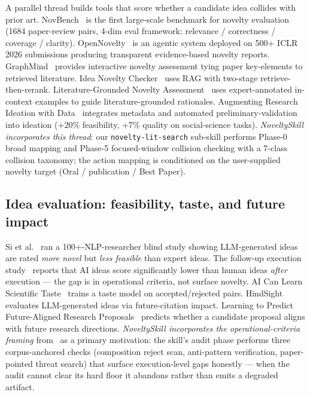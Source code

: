 \documentclass[10pt,a4paper]{article}
\begin{document}
A parallel thread builds tools that score whether a candidate idea collides with prior art. NovBench~\cite{novbench2026} is the first large-scale benchmark for novelty evaluation (1684 paper-review pairs, 4-dim eval framework: relevance / correctness / coverage / clarity). OpenNovelty~\cite{opennovelty2026} is an agentic system deployed on 500+ ICLR 2026 submissions producing transparent evidence-based novelty reports. GraphMind~\cite{graphmind2025} provides interactive novelty assessment tying paper key-elements to retrieved literature. Idea Novelty Checker~\cite{idea_novelty_checker2025} uses RAG with two-stage retrieve-then-rerank. Literature-Grounded Novelty Assessment~\cite{litgrounded2025} uses expert-annotated in-context examples to guide literature-grounded rationales. Augmenting Research Ideation with Data~\cite{augment_ideation2026} integrates metadata and automated preliminary-validation into ideation (+20\% feasibility, +7\% quality on social-science tasks). \emph{NoveltySkill incorporates this thread}: our \texttt{novelty-lit-search} sub-skill performs Phase-0 broad mapping and Phase-5 focused-window collision checking with a 7-class collision taxonomy; the action mapping is conditioned on the user-supplied novelty target (Oral / publication / Best Paper).

\subsection{Idea evaluation: feasibility, taste, and future impact}
\label{subsec:related-evaluation}

Si et al.~\cite{si2024llmideas} ran a 100+-NLP-researcher blind study showing LLM-generated ideas are rated \emph{more novel} but \emph{less feasible} than expert ideas. The follow-up execution study~\cite{si2026execution} reports that AI ideas score significantly lower than human ideas \emph{after} execution --- the gap is in operational criteria, not surface novelty. AI Can Learn Scientific Taste~\cite{ai_taste2026} trains a taste model on accepted/rejected pairs. HindSight~\cite{hindsight2026} evaluates LLM-generated ideas via future-citation impact. Learning to Predict Future-Aligned Research Proposals~\cite{future_aligned2026} predicts whether a candidate proposal aligns with future research directions. \emph{NoveltySkill incorporates the operational-criteria framing} from~\cite{si2026execution} as a primary motivation: the skill's audit phase performs three corpus-anchored checks (composition reject scan, anti-pattern verification, paper-pointed threat search) that surface execution-level gaps honestly --- when the audit cannot clear its hard floor it abandons rather than emits a degraded artifact.
\end{document}
